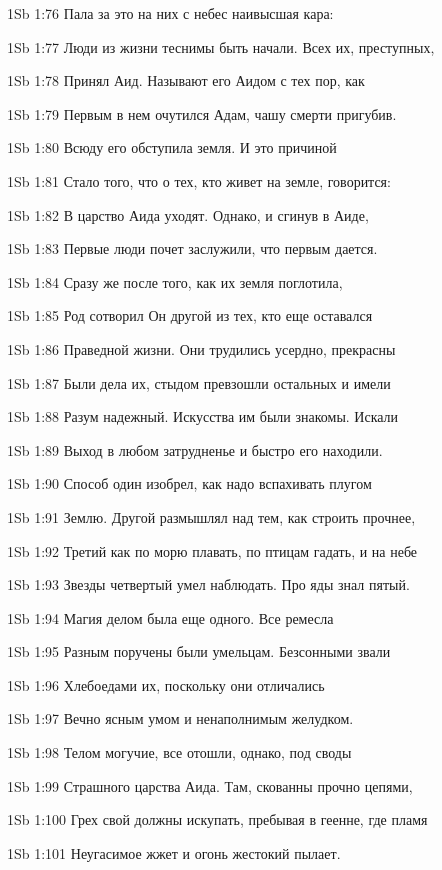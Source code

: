 \vs 1Sb 1:76 Пала за это на них с небес наивысшая кара:

\vs 1Sb 1:77 Люди из жизни теснимы быть начали. Всех их, преступных,

\vs 1Sb 1:78 Принял Аид. Называют его Аидом с тех пор, как

\vs 1Sb 1:79 Первым в нем очутился Адам, чашу смерти пригубив.

\vs 1Sb 1:80 Всюду его обступила земля. И это причиной

\vs 1Sb 1:81 Стало того, что о тех, кто живет на земле, говорится:

\vs 1Sb 1:82 В царство Аида уходят. Однако, и сгинув в Аиде,

\vs 1Sb 1:83 Первые люди почет заслужили, что первым дается.

\vs 1Sb 1:84 Сразу же после того, как их земля поглотила,

\vs 1Sb 1:85 Род сотворил Он другой  из тех, кто еще оставался

\vs 1Sb 1:86 Праведной жизни. Они трудились усердно, прекрасны

\vs 1Sb 1:87 Были дела их, стыдом превзошли остальных и имели

\vs 1Sb 1:88 Разум надежный. Искусства им были знакомы. Искали

\vs 1Sb 1:89 Выход в любом затрудненье и быстро его находили.

\vs 1Sb 1:90 Способ один изобрел, как надо вспахивать плугом

\vs 1Sb 1:91 Землю. Другой размышлял над тем, как строить прочнее,

\vs 1Sb 1:92 Третий  как по морю плавать, по птицам гадать, и на небе

\vs 1Sb 1:93 Звезды четвертый умел наблюдать. Про яды знал пятый.

\vs 1Sb 1:94 Магия делом была еще одного. Все ремесла

\vs 1Sb 1:95 Разным поручены были умельцам. Безсонными звали

\vs 1Sb 1:96 Хлебоедами их, поскольку они отличались

\vs 1Sb 1:97 Вечно ясным умом и ненаполнимым желудком.

\vs 1Sb 1:98 Телом могучие, все отошли, однако, под своды

\vs 1Sb 1:99 Страшного царства Аида. Там, скованны прочно цепями,

\vs 1Sb 1:100 Грех свой должны искупать, пребывая в геенне, где пламя

\vs 1Sb 1:101 Неугасимое жжет и огонь жестокий пылает.


